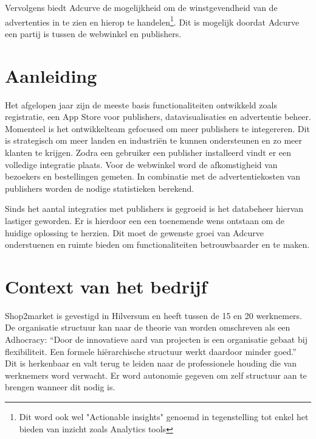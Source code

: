 Vervolgens biedt Adcurve de mogelijkheid om de winstgevendheid van de advertenties in te zien en hierop te handelen\footnote{Dit word ook wel "Actionable insights" genoemd in tegenstelling tot enkel het bieden van inzicht zoals Analytics tools}. Dit is mogelijk doordat Adcurve een partij is tussen de webwinkel en publishers.

\section{Aanleiding} %

Het afgelopen jaar zijn de meeste basis functionaliteiten ontwikkeld zoals registratie, een App Store voor publishers, datavisualisaties en advertentie beheer. Momenteel is het ontwikkelteam gefocused om meer publishers te integereren.
Dit is strategisch om meer landen en industriën te kunnen ondersteunen en zo meer klanten te krijgen. Zodra een gebruiker een publisher installeerd vindt er een volledige integratie plaats.
Voor de webwinkel word de afkomstigheid van bezoekers en bestellingen gemeten. In combinatie met de advertentiekosten van publishers worden de nodige statistieken berekend.


Sinds het aantal integraties met publishers is gegroeid is het databeheer hiervan lastiger geworden. Er is hierdoor een een toenemende wens ontstaan om de huidige oplossing te herzien. Dit moet de gewenste groei van Adcurve onderstuenen en ruimte bieden om functionaliteiten betrouwbaarder en te maken.

\section{Context van het bedrijf} %

Shop2market is gevestigd in Hilversum en heeft tussen de 15 en 20 werknemers. De organisatie structuur kan naar de theorie van
\autocite{mintzberg} worden omschreven als een Adhocracy: “Door de innovatieve aard van projecten is een organisatie gebaat bij flexibiliteit. Een formele hiërarchische structuur werkt daardoor minder goed.” Dit is herkenbaar en valt terug te leiden naar de professionele houding die van werknemers word verwacht. Er word autonomie gegeven om zelf structuur aan te brengen wanneer dit nodig is.


